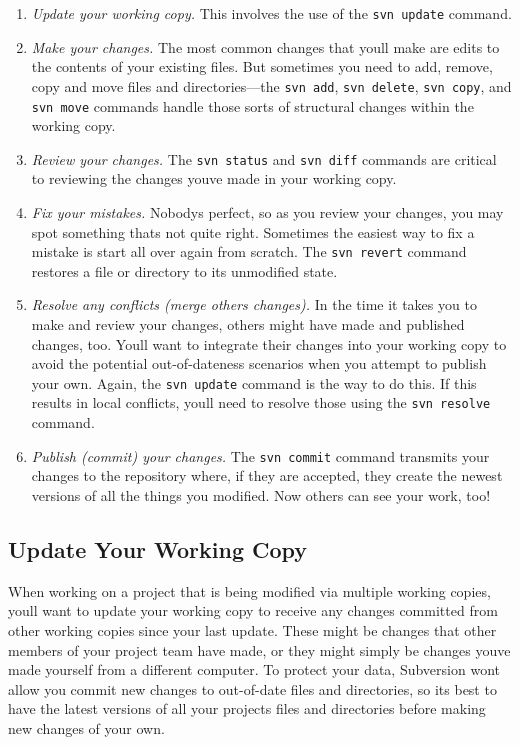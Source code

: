 \begin{enumerate}
\def\labelenumi{\arabic{enumi}.}
\item
  \emph{Update your working copy.} This involves the use of the
  \texttt{svn\ update} command.
\item
  \emph{Make your changes.} The most common changes that
  you\textquotesingle ll make are edits to the contents of your existing
  files. But sometimes you need to add, remove, copy and move files and
  directories---the \texttt{svn\ add}, \texttt{svn\ delete},
  \texttt{svn\ copy}, and \texttt{svn\ move} commands handle those sorts
  of structural changes within the working copy.
\item
  \emph{Review your changes.} The \texttt{svn\ status} and
  \texttt{svn\ diff} commands are critical to reviewing the changes
  you\textquotesingle ve made in your working copy.
\item
  \emph{Fix your mistakes.} Nobody\textquotesingle s perfect, so as you
  review your changes, you may spot something that\textquotesingle s not
  quite right. Sometimes the easiest way to fix a mistake is start all
  over again from scratch. The \texttt{svn\ revert} command restores a
  file or directory to its unmodified state.
\item
  \emph{Resolve any conflicts (merge others\textquotesingle{} changes).}
  In the time it takes you to make and review your changes, others might
  have made and published changes, too. You\textquotesingle ll want to
  integrate their changes into your working copy to avoid the potential
  out-of-dateness scenarios when you attempt to publish your own. Again,
  the \texttt{svn\ update} command is the way to do this. If this
  results in local conflicts, you\textquotesingle ll need to resolve
  those using the \texttt{svn\ resolve} command.
\item
  \emph{Publish (commit) your changes.} The \texttt{svn\ commit} command
  transmits your changes to the repository where, if they are accepted,
  they create the newest versions of all the things you modified. Now
  others can see your work, too!
\end{enumerate}

\subsection{Update Your Working Copy}\label{svn.tour.cycle.update}

When working on a project that is being modified via multiple working
copies, you\textquotesingle ll want to update your working copy to
receive any changes committed from other working copies since your last
update. These might be changes that other members of your project team
have made, or they might simply be changes you\textquotesingle ve made
yourself from a different computer. To protect your data, Subversion
won\textquotesingle t allow you commit new changes to out-of-date files
and directories, so it\textquotesingle s best to have the latest
versions of all your project\textquotesingle s files and directories
before making new changes of your own.

